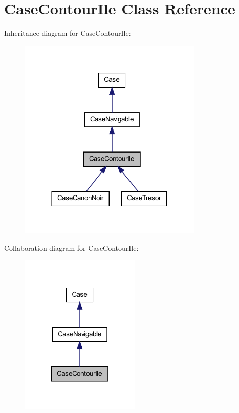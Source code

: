 \hypertarget{class_case_contour_ile}{
\section{CaseContourIle Class Reference}
\label{class_case_contour_ile}
}


Inheritance diagram for CaseContourIle:
\nopagebreak
\begin{figure}[H]
\begin{center}
\leavevmode
\includegraphics[width=248pt]{class_case_contour_ile__inherit__graph}
\end{center}
\end{figure}


Collaboration diagram for CaseContourIle:
\nopagebreak
\begin{figure}[H]
\begin{center}
\leavevmode
\includegraphics[width=162pt]{class_case_contour_ile__coll__graph}
\end{center}
\end{figure}
